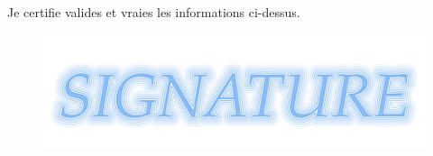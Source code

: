 \documentclass[11pt, a4paper]{awesome-cv} %
\begin{document}
\vspace{10cm}
\begin{flushleft}
Je certifie valides et vraies les informations ci-dessus.
\end{flushleft}
\begin{figure}[!h]
\begin{flushright}
\includegraphics[scale=0.2]{sign}
\end{flushright}
\end{figure}





\end{document}
